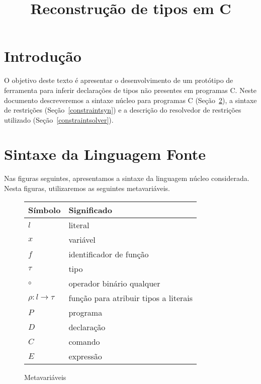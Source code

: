 \documentclass[a4paper,8pt]{article}
\begin{document}
     \title{Reconstrução de tipos em C}

     \maketitle
     

     \section{Introdução}\label{intro}

     O objetivo deste texto é apresentar o desenvolvimento de um
     protótipo de ferramenta para inferir declarações de tipos não
     presentes em programas C. Neste documento descreveremos
     a sintaxe núcleo para programas C (Seção~\ref{corecsyn}), a
     sintaxe de restrições (Seção~\ref{constraintsyn}) e a descrição
     do resolvedor de restrições utilizado
     (Seção~\ref{constraintsolver}).

     \section{Sintaxe da Linguagem Fonte}\label{corecsyn}

     Nas figuras seguintes, apresentamos a sintaxe da linguagem núcleo
     considerada. Nesta figuras, utilizaremos as seguintes metavariáveis.

     \begin{figure}[H]
     \begin{tabular}{|l|l|}
       \hline
       Símbolo & Significado \\ \hline
		$l$ & {literal} \\
		$x$ & {variável}\\
		$f$  & {identificador de função} \\
		$\tau$ & {tipo}\\
		$\circ$ & {operador binário qualquer}\\
                $\rho : l \to \tau$ & {função para atribuir tipos a
                                      literais}\\
                $P$ & {programa} \\
                $D$ & {declaração} \\
                $C$ & {comando} \\
                $E$ & {expressão}\\
		\hline
		\end{tabular}
           \centering
           \caption{Metavariáveis}
           \label{figmetavar}
       \end{figure}
\end{document}
